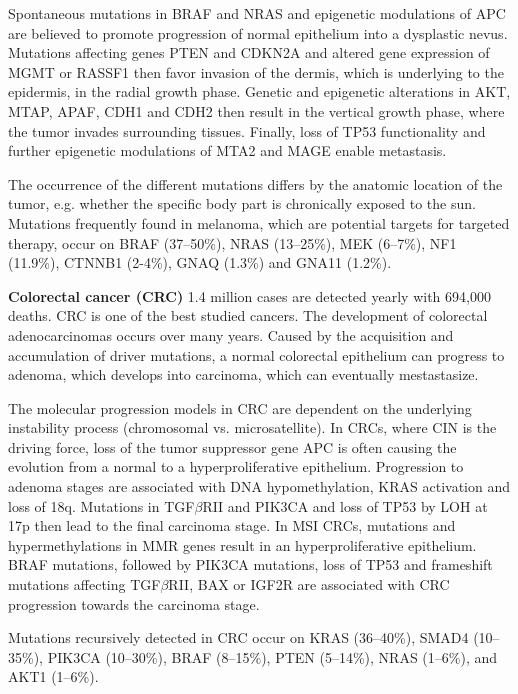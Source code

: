     Spontaneous mutations in BRAF and NRAS and epigenetic modulations of APC are
    believed to promote progression of normal epithelium into a dysplastic
    nevus. Mutations affecting genes PTEN and CDKN2A and altered gene expression
    of MGMT or RASSF1 then favor invasion of the dermis, which is underlying to
    the epidermis, in the radial growth phase. Genetic and epigenetic
    alterations in AKT, MTAP, APAF, CDH1 and CDH2 then result in the vertical
    growth phase, where the tumor invades surrounding tissues. Finally, loss of
    TP53 functionality and further epigenetic modulations of MTA2 and MAGE
    enable metastasis.

    The occurrence of the different mutations differs by the anatomic location
    of the tumor, e.g. whether the specific body part is chronically exposed to
    the sun. Mutations frequently found in melanoma, which are potential targets
    for targeted therapy, occur on BRAF (37--50\%), NRAS (13--25\%), MEK
    (6--7\%), NF1 (11.9\%), CTNNB1 (2-4\%), GNAQ (1.3\%) and GNA11 (1.2\%).

    \textbf{Colorectal cancer (CRC)} 1.4 million cases are detected yearly with
    694,000 deaths. CRC is one of the best studied cancers. The development of
    colorectal adenocarcinomas occurs over many years. Caused by the acquisition
    and accumulation of driver mutations, a normal colorectal epithelium can
    progress to adenoma, which develops into carcinoma, which can eventually
    mestastasize.

    The molecular progression models in CRC are dependent on the underlying
    instability process (chromosomal vs. microsatellite). In CRCs, where CIN
    is the driving force, loss of the tumor suppressor gene APC is often
    causing the evolution from a normal to a hyperproliferative epithelium.
    Progression to adenoma stages are associated with DNA hypomethylation, KRAS
    activation and loss of 18q. Mutations in TGF$\beta$RII and PIK3CA and loss
    of TP53 by LOH at 17p then lead to the final carcinoma stage. In MSI
    CRCs, mutations and hypermethylations in MMR genes result in an
    hyperproliferative epithelium. BRAF mutations, followed by PIK3CA mutations,
    loss of TP53 and frameshift mutations affecting TGF$\beta$RII, BAX or IGF2R
    are associated with CRC progression towards the carcinoma stage.

    Mutations recursively detected in CRC occur on KRAS (36--40\%), SMAD4
    (10--35\%), PIK3CA (10--30\%), BRAF (8--15\%), PTEN (5--14\%), NRAS
    (1--6\%), and  AKT1 (1--6\%).

